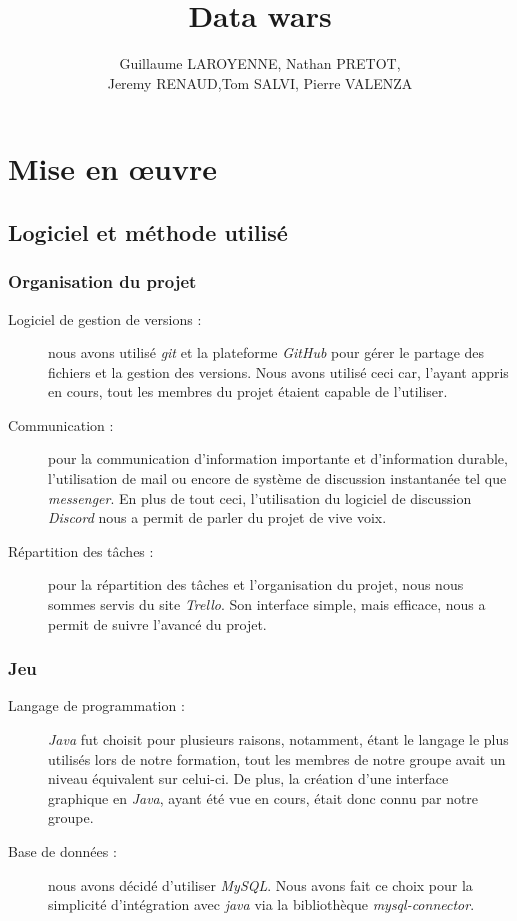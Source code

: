 \documentclass[a4paper,11pt]{report}
\title{Data wars}
\author{Guillaume LAROYENNE, Nathan PRETOT,\\ Jeremy RENAUD,Tom SALVI, Pierre VALENZA}
\begin{document}
\maketitle
\tableofcontents

\begin{abstract}
\end{abstract}

\chapter{Mise en œuvre}
  \section{Logiciel et méthode utilisé}
  \subsection{Organisation du projet}
     \begin{description}
       \item[Logiciel de gestion de versions :] nous avons utilisé \textit{git} et la plateforme \textit{GitHub} pour gérer le partage des fichiers et la gestion des versions. Nous avons utilisé ceci car, l'ayant appris en cours, tout les membres du projet étaient capable de l'utiliser.
       \item[Communication :] pour la communication d'information importante et d'information durable, l'utilisation de mail ou encore de système de discussion instantanée tel que \textit{messenger}. En plus de tout ceci, l'utilisation du logiciel de discussion \textit{Discord} nous a permit de parler du projet de vive voix.
       \item[Répartition des tâches :] pour la répartition des tâches et l'organisation du projet, nous nous sommes servis du site \textit{Trello}. Son interface simple, mais efficace, nous a permit de suivre l'avancé du projet.
     \end{description}
  
  \subsection{Jeu}
    \begin{description}
      \item[Langage de programmation :] \textit{Java} fut choisit pour plusieurs raisons, notamment, étant le langage le plus utilisés lors de notre formation, tout les membres de notre groupe avait un niveau équivalent sur celui-ci. De plus, la création d'une interface graphique en \textit{Java}, ayant été vue en cours, était donc connu par notre groupe.   
      \item[Base de données :] nous avons décidé d'utiliser \textit{MySQL}. Nous avons fait ce choix pour la simplicité d’intégration avec \textit{java} via la bibliothèque \textit{mysql-connector}.
      
    \end{description}
  
\end{document}
